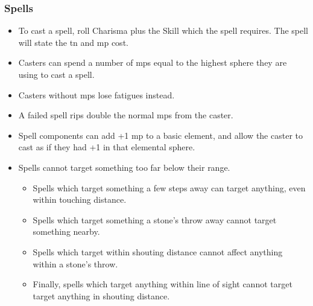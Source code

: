 \subsubsection*{Spells}
\begin{itemize}
  \item
  To cast a spell, roll Charisma plus the Skill which the spell requires.
  The spell will state the \gls{tn} and \gls{mp} cost.
  \item
  Casters can spend a number of \glspl{mp} equal to the highest sphere they are using to cast a spell.
  \item
  Casters without \glspl{mp} lose \glspl{fatigue} instead.
  \item
  A failed spell rips double the normal \glspl{mp} from the caster.
  \item
  Spell components can add +1 \gls{mp} to a basic element, and allow the caster to cast as if they had +1 in that elemental sphere.
  \item
  Spells cannot target something too far below their range.
  \begin{itemize}
    \item
    Spells which target something a few steps away can target anything, even within touching distance.
    \item
    Spells which target something a stone's throw away cannot target something nearby.
    \item
    Spells which target within shouting distance cannot affect anything within a stone's throw.
    \item
    Finally, spells which target anything within line of sight cannot target target anything in shouting distance.
  \end{itemize}
\end{itemize}
